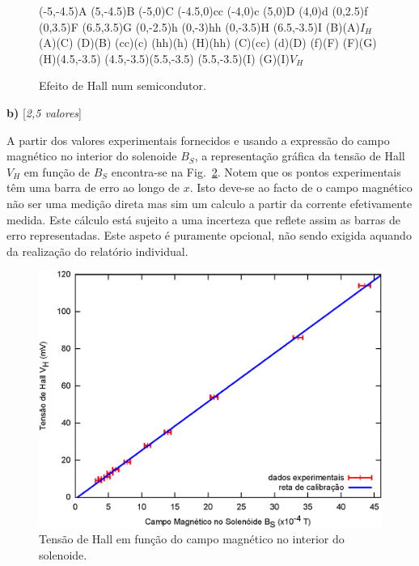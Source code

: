 \documentclass[11pt,a4paper,final]{article}
\begin{document}
\begin{figure}[h]
\begin{pspicture}[showgrid=false]
\pnode(-5,-4.5){A}
\pnode(5,-4.5){B}
\pnode(-5,0){C}
\pnode(-4.5,0){cc}
\pnode(-4,0){c}
\pnode(5,0){D}
\pnode(4,0){d}
\pnode(0,2.5){f}
\pnode(0,3.5){F}
\pnode(6.5,3.5){G}
\pnode(0,-2.5){h}
\pnode(0,-3){hh}
\pnode(0,-3.5){H}
\pnode(6.5,-3.5){I}
\Ucc[labelInside=1,labeloffset=1](B)(A){$I_H$}
\wire[intensity,intensitywidth=3\pslinewidth](A)(C)
\wire[intensity,intensitywidth=3\pslinewidth](D)(B)
\wire[arrows=-*,linestyle=dashed](cc)(c)
\wire[arrows=-*,linestyle=dashed](hh)(h)
\wire(H)(hh)
\wire(C)(cc)
\wire[arrows=*-](d)(D)
\wire[arrows=*-](f)(F)
\wire[arrows=-o](F)(G)
\wire(H)(4.5,-3.5)
\wire[intersect,intersectA=D,intersectB=B](4.5,-3.5)(5.5,-3.5)
\wire[arrows=-o](5.5,-3.5)(I)
\tension(G)(I){$V_H$}
\end{pspicture}
\caption{\label{fig:hall}Efeito de Hall num semicondutor.}
\end{figure}

\textbf{b)} \hfill [\textit{2,5 valores}]

A partir dos valores experimentais fornecidos e usando a express\~{a}o do campo magn\'{e}tico no interior do solenoide $B_S$, a representa\c{c}\~{a}o gr\'{a}fica da tens\~{a}o de Hall $V_H$ em fun\c{c}\~{a}o de $B_S$ encontra-se na Fig.~\ref{fig:calibracao}. Notem que os pontos experimentais t\^{e}m uma barra de erro ao longo de $x$. Isto deve-se ao facto de o campo magn\'{e}tico n\~{a}o ser uma medi\c{c}\~{a}o direta mas sim um calculo a partir da corrente efetivamente medida. Este c\'{a}lculo est\'{a} sujeito a uma incerteza que reflete assim as barras de erro representadas. Este aspeto \'{e} puramente opcional, n\~{a}o sendo exigida aquando da realiza\c{c}\~{a}o do relat\'{o}rio individual.

\begin{figure}[h]
\centering
\includegraphics[scale=1]{calibracao.eps}
\caption{\label{fig:calibracao}Tens\~{a}o de Hall em fun\c{c}\~{a}o do campo magn\'{e}tico no interior do solenoide.}
\end{figure}
\end{document}
